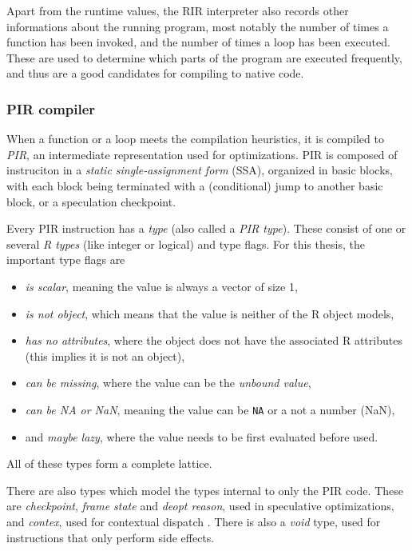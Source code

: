 Apart from the runtime values, the RIR interpreter also records other informations about the running program, most notably the number of times a function has been invoked, and the number of times a loop has been executed. These are used to determine which parts of the program are executed frequently, and thus are a good candidates for compiling to native code.

\subsubsection*{PIR compiler}
When a function or a loop meets the compilation heuristics, it is compiled to \textit{PIR}, an intermediate representation used for optimizations. PIR is composed of instruciton in a \textit{static single-assignment form} (SSA), organized in basic blocks, with each block being terminated with a (conditional) jump to another basic block, or a speculation checkpoint.

Every PIR instruction has a \textit{type} (also called a \textit{PIR type}). These consist of one or several \textit{R types} (like integer or logical) and type flags. For this thesis, the important type flags are
\begin{itemize}
	\item{} \textit{is scalar}, meaning the value is always a vector of size 1,
	\item{} \textit{is not object}, which means that the value is neither of the R object models,
	\item{} \textit{has no attributes}, where the object does not have the associated R attributes (this implies it is not an object),
	\item{} \textit{can be missing}, where the value can be the \textit{unbound value},
	\item{} \textit{can be NA or NaN}, meaning the value can be \texttt{NA} or a not a number (NaN),
	\item{} and \textit{maybe lazy}, where the value needs to be first evaluated before used.
\end{itemize}
All of these types form a complete lattice.

There are also types which model the types internal to only the PIR code. These are \textit{checkpoint}, \textit{frame state} and \textit{deopt reason}, used in speculative optimizations, and \textit{contex}, used for contextual dispatch . There is also a \textit{void} type, used for instructions that only perform side effects.


